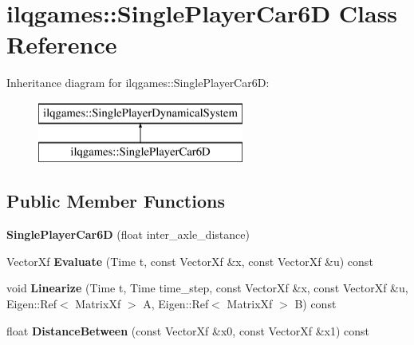 \hypertarget{classilqgames_1_1_single_player_car6_d}{}\section{ilqgames\+:\+:Single\+Player\+Car6D Class Reference}
\label{classilqgames_1_1_single_player_car6_d}
Inheritance diagram for ilqgames\+:\+:Single\+Player\+Car6D\+:\begin{figure}[H]
\begin{center}
\leavevmode
\includegraphics[height=2.000000cm]{classilqgames_1_1_single_player_car6_d}
\end{center}
\end{figure}
\subsection*{Public Member Functions}
\begin{DoxyCompactItemize}
\item 
{\bfseries Single\+Player\+Car6D} (float inter\+\_\+axle\+\_\+distance)\hypertarget{classilqgames_1_1_single_player_car6_d_a1447d0191222caa085c9136e776b75a2}{}\label{classilqgames_1_1_single_player_car6_d_a1447d0191222caa085c9136e776b75a2}

\item 
Vector\+Xf {\bfseries Evaluate} (Time t, const Vector\+Xf \&x, const Vector\+Xf \&u) const \hypertarget{classilqgames_1_1_single_player_car6_d_a60e07c8bde8c99b24f674b78b61c1f82}{}\label{classilqgames_1_1_single_player_car6_d_a60e07c8bde8c99b24f674b78b61c1f82}

\item 
void {\bfseries Linearize} (Time t, Time time\+\_\+step, const Vector\+Xf \&x, const Vector\+Xf \&u, Eigen\+::\+Ref$<$ Matrix\+Xf $>$ A, Eigen\+::\+Ref$<$ Matrix\+Xf $>$ B) const \hypertarget{classilqgames_1_1_single_player_car6_d_a083dd0ed800f8f2f91d74cf6d619ad0e}{}\label{classilqgames_1_1_single_player_car6_d_a083dd0ed800f8f2f91d74cf6d619ad0e}

\item 
float {\bfseries Distance\+Between} (const Vector\+Xf \&x0, const Vector\+Xf \&x1) const \hypertarget{classilqgames_1_1_single_player_car6_d_a4874842c55f3591e26707e1440466ff6}{}\label{classilqgames_1_1_single_player_car6_d_a4874842c55f3591e26707e1440466ff6}

\end{DoxyCompactItemize}
